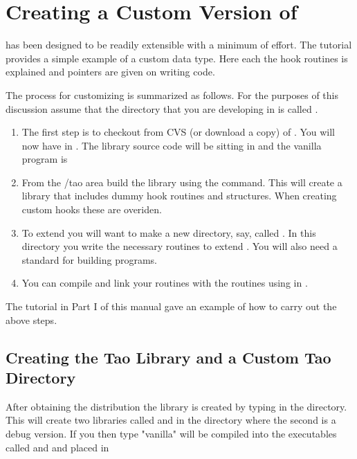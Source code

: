 
\chapter{Creating a Custom Version of \tao}
\label{c:prog_customizing} 

\tao has been designed to be readily extensible with a minimum of
effort. The tutorial provides a simple example of a custom data type. Here each
the hook routines is explained and pointers are given on writing code. 

The process for customizing is summarized as follows. For the purposes of this
discussion assume that the directory that you are developing \tao in
is called . 
\begin{enumerate}
\item 
The first step is to checkout from CVS (or download a
copy) of \tao. You will now have \tao in
. The library source code will be sitting in 
and the vanilla \tao program is 
\item 
From the /tao area build the \tao library using the
 command. This will create a \tao library that includes dummy hook
routines and structures. When creating custom hooks these are overiden.
\item
To extend \tao you will want to make a new
directory, say, called . In this directory you write
the necessary routines to extend \tao. You will also need a standard 
 for building programs.
\item
You can compile and link your routines with the \tao routines using
 in .
\end{enumerate}

The tutorial in Part I of this manual gave an example of how to carry out the
above steps.

\section{Creating the Tao Library and a Custom Tao Directory}

After obtaining the \tao distribution the \tao library is created by typing
 in the  directory. This will create two libraries
called  and  in the directory  where
the second is a debug version. If you then type  "vanilla"
\tao will be compiled into the executables called  and  and
placed in 


